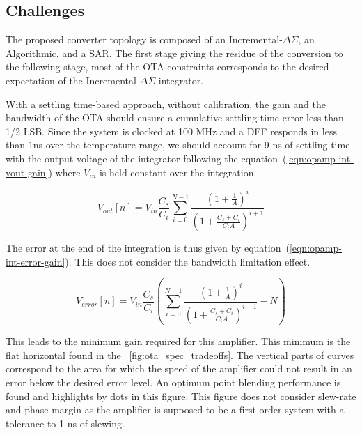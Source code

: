     \subsection{Challenges}                      %
The proposed converter topology is composed of an Incremental-\(\Delta\Sigma \), an Algorithmic, and a SAR\@. The first stage giving the residue of the conversion to the following stage, most of the OTA constraints corresponds to the desired expectation of the Incremental-\(\Delta\Sigma \) integrator.

With a settling time-based approach, without calibration, the gain and the bandwidth of the OTA should ensure a cumulative settling-time error less than 1/2 LSB\@. Since the system is clocked at 100 MHz and a DFF responds in less than 1ns over the temperature range, we should account for 9 ns of settling time with the output voltage of the integrator following the equation~(\ref{eqn:opamp-int-vout-gain}) where \(V_{in} \) is held constant over the integration.

\begin{equation}
\label{eqn:opamp-int-vout-gain}
V_{out}[n] = V_{in} \frac{C_s}{C_i}\sum_{i=0}^{N-1}\frac{{\left(1+\frac{1}{A} \right)}^i}{{\left(1+\frac{C_s+C_i}{C_i A} \right)}^{i+1}}
\end{equation}

The error at the end of the integration is thus given by equation~(\ref{eqn:opamp-int-error-gain}). This does not consider the bandwidth limitation effect.

\begin{equation}
\label{eqn:opamp-int-error-gain}
V_{error}[n] = V_{in} \frac{C_s}{C_i} \left( \sum_{i=0}^{N-1}\frac{{\left(1+\frac{1}{A} \right)}^i}{{\left(1+\frac{C_s+C_i}{C_i A} \right)}^{i+1}} - N \right)
\end{equation}

This leads to the minimum gain required for this amplifier. This minimum is the flat horizontal found in the \figurename~\ref{fig:ota_spec_tradeoffs}. The vertical parts of curves correspond to the area for which the speed of the amplifier could not result in an error below the desired error level. An optimum point blending performance is found and highlights by dots in this figure. This figure does not consider slew-rate and phase margin as the amplifier is supposed to be a first-order system with a tolerance to 1 ns of slewing.

